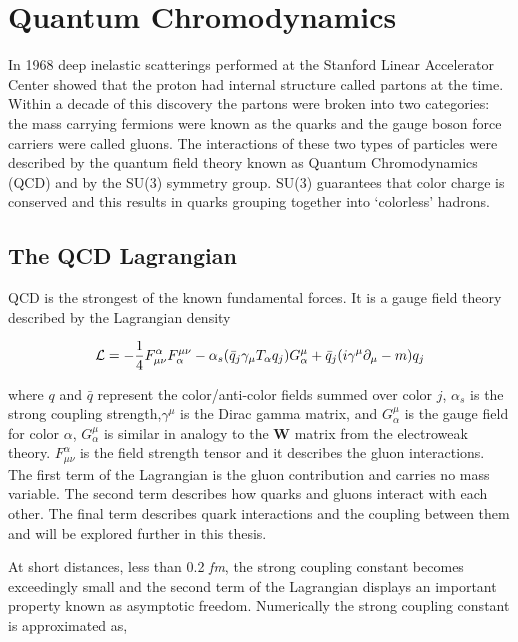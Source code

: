 
\chapter{Quantum Chromodynamics} \label{ch:qcd}
In 1968 deep inelastic scatterings performed at the Stanford Linear Accelerator Center showed that the proton had internal structure\cite{Riordan1287} called partons at the time.  Within a decade of this discovery the partons were broken into two categories: the mass carrying fermions were known as the quarks and the gauge boson force carriers were called gluons.  The interactions of these two types of particles were described by the quantum field theory known as Quantum Chromodynamics (QCD) and by the SU(3) symmetry group.  SU(3) guarantees that color charge is conserved and this results in quarks grouping together into `colorless' hadrons.

\section{The QCD Lagrangian}
QCD is the strongest of the known fundamental forces.  It is a gauge field theory described by the Lagrangian density

\begin{equation}
{\cal L}=-\frac{1}{4}F^{\alpha}_{\mu\nu}F^{\mu\nu}_{\alpha}
- \alpha_{s} (\bar{q}_{j}\gamma_{\mu}T_{\alpha}q_{j})G_{\alpha}^{\mu}
+ \bar{q}_{j}(i\gamma^{\mu} \partial_{\mu} - m)q_{j}
\label{eq:lagrangian}
\end{equation}

\noindent
where $q$ and $\bar{q}$ represent the color/anti-color fields summed over color $j$, $\alpha_{s}$ is the strong coupling strength,$\gamma^{\mu}$ is the Dirac gamma matrix, and $G_{\alpha}^{\mu}$ is the gauge field for color \textit{$\alpha$}, $G_{\alpha}^{\mu}$ is similar in analogy to the \textbf{W} matrix from the electroweak theory.  $F^{\alpha}_{\mu\nu}$ is the field strength tensor and it describes the gluon interactions. The first term of the Lagrangian is the gluon contribution and carries no mass variable.  The second term describes how quarks and gluons interact with each other. The final term describes quark interactions and the coupling between them and will be explored further in this thesis.

At short distances, less than 0.2 \textit{fm}, the strong coupling constant becomes exceedingly small and the second term of the Lagrangian displays an important property known as asymptotic freedom\cite{Wilczek:2005az}.  Numerically the strong coupling constant is approximated as,

